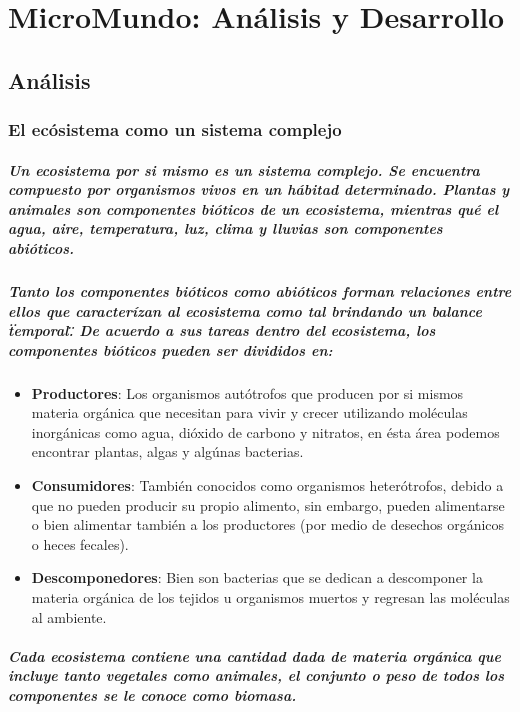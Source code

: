 \chapter{MicroMundo: Análisis y Desarrollo}
  \section{Análisis}
  	\subsection{El ecósistema como un sistema complejo}
  		\paragraph{Un ecosistema por si mismo es un sistema complejo. Se encuentra compuesto por organismos vivos en un hábitad determinado. Plantas y animales son componentes bióticos de un ecosistema, mientras qué el agua, aire, temperatura, luz, clima y lluvias son componentes abióticos.}
  		\paragraph{Tanto los componentes bióticos como abióticos forman relaciones entre ellos que caracterízan al ecosistema como tal brindando un balance \"temporal\". De acuerdo a sus tareas dentro del ecosistema, los componentes bióticos pueden ser divididos en:}
  		\begin{itemize}
  			\item \textbf{Productores}: Los organismos autótrofos que producen por si mismos materia orgánica que necesitan para vivir y crecer utilizando moléculas inorgánicas como agua, dióxido de carbono y nitratos, en ésta área podemos encontrar plantas, algas y algúnas bacterias.
			\item \textbf{Consumidores}: También conocidos como organismos heterótrofos, debido a que no pueden producir su propio alimento, sin embargo, pueden alimentarse o bien alimentar también a los productores (por medio de desechos orgánicos o heces fecales).
			\item \textbf{Descomponedores}: Bien son bacterias que se dedican a descomponer la materia orgánica de los tejidos u organismos muertos y regresan las moléculas al ambiente.
  		\end{itemize}
  		\paragraph{Cada ecosistema contiene una cantidad dada de materia orgánica que incluye tanto vegetales como animales, el conjunto o peso de todos los componentes se le conoce como biomasa.\cite{6}}
